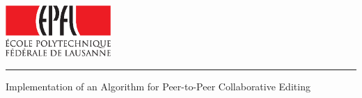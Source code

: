 
%        




\newcommand{\logoepfl}[0]{
  \begin{center}
    \includegraphics[width=4cm]{logo_epfl_coul.eps}
  \end{center}
  \vspace{0.3cm}
  \hrule
}
\newcommand{\project}[1]{
  \begin{center}
    \large{#1}
  \end{center}
  \vspace{1cm}
}
\newcommand{\department}[1]{
  \begin{center}
    \large{#1}
  \end{center}
}
\newcommand{\lab}[1]{
  \begin{center}
    \large{#1}
  \end{center}
}
\newcommand{\supervisor}[3]{
  \begin{center}
    \begin{normalsize}{
        \bf #1}\\#2\\#3
    \end{normalsize}
  \end{center}
}
\renewcommand{\author}[1]{
  \begin{center}
    \Large{#1}
  \end{center}
  \vspace{0.5cm}
}
\renewcommand{\title}[1]{
  \vspace{3cm}
  \begin{center}
    \huge{#1}
  \end{center}
  \vspace{1.7cm}
}
\renewcommand{\date}[2]{
  \begin{center}
    \normalsize{#1 #2}
  \end{center}
  \vspace{0.5cm}
}


\thispagestyle{empty}


  \logoepfl
  
  \title{Implementation of an Algorithm for Peer-to-Peer Collaborative Editing}
  
